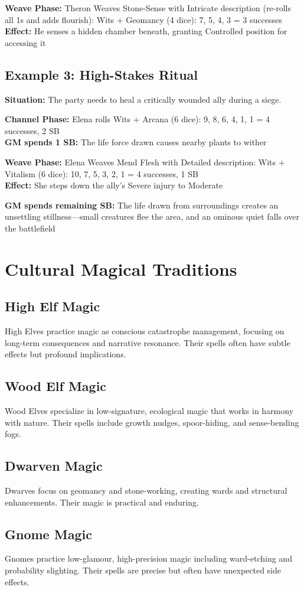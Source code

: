 \documentclass[11pt]{report}
\begin{document}
\textbf{Weave Phase:} Theron Weaves Stone-Sense with Intricate description (re-rolls all 1s and adds flourish): Wits + Geomancy (4 dice): 7, 5, 4, 3 = 3 successes\\
\textbf{Effect:} He senses a hidden chamber beneath, granting Controlled position for accessing it

\subsection{Example 3: High-Stakes Ritual}
\textbf{Situation:} The party needs to heal a critically wounded ally during a siege.

\textbf{Channel Phase:} Elena rolls Wits + Arcana (6 dice): 9, 8, 6, 4, 1, 1 = 4 successes, 2 SB\\
\textbf{GM spends 1 SB:} The life force drawn causes nearby plants to wither

\textbf{Weave Phase:} Elena Weaves Mend Flesh with Detailed description: Wits + Vitalism (6 dice): 10, 7, 5, 3, 2, 1 = 4 successes, 1 SB\\
\textbf{Effect:} She steps down the ally's Severe injury to Moderate

\textbf{GM spends remaining SB:} The life drawn from surroundings creates an unsettling stillness—small creatures flee the area, and an ominous quiet falls over the battlefield

\section{Cultural Magical Traditions}

\subsection{High Elf Magic}
High Elves practice magic as conscious catastrophe management, focusing on long-term consequences and narrative resonance. Their spells often have subtle effects but profound implications.

\subsection{Wood Elf Magic}
Wood Elves specialize in low-signature, ecological magic that works in harmony with nature. Their spells include growth nudges, spoor-hiding, and sense-bending fogs.

\subsection{Dwarven Magic}
Dwarves focus on geomancy and stone-working, creating wards and structural enhancements. Their magic is practical and enduring.

\subsection{Gnome Magic}
Gnomes practice low-glamour, high-precision magic including ward-etching and probability slighting. Their spells are precise but often have unexpected side effects.
\end{document}
